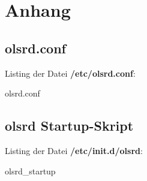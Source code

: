 
\section{Anhang}

\subsection{olsrd.conf}
\label{olsrd.conf}

Listing der Datei \textbf{/etc/olsrd.conf}:

{olsrd.conf}

\subsection{olsrd Startup-Skript}
\label{olsrd_startup}

Listing der Datei \textbf{/etc/init.d/olsrd}:

{olsrd_startup}
